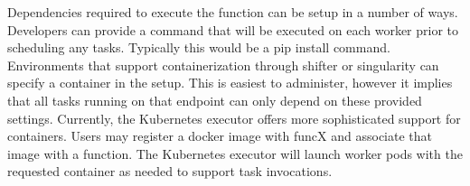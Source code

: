 Dependencies required to execute the function can be setup in a number of ways. Developers can provide a command that will be executed on each worker prior to scheduling any tasks. Typically this would be a pip install command. Environments that support containerization through shifter or singularity can specify a container in the setup. This is easiest to administer, however it implies that all tasks running on that endpoint can only depend on these provided settings. Currently, the Kubernetes executor offers more sophisticated support for containers. Users may register a docker image with funcX and associate that image with a function. The Kubernetes executor will launch worker pods with the requested container as needed to support task invocations.
